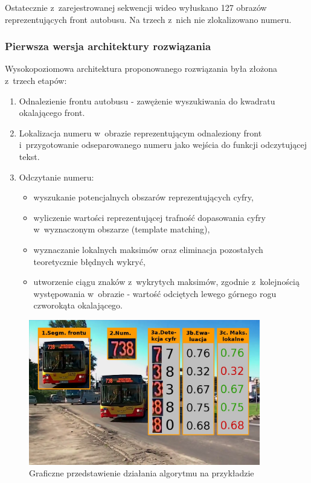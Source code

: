 Ostatecznie z~zarejestrowanej sekwencji wideo wyłuskano 127 obrazów
reprezentujących front autobusu. Na trzech z~nich nie zlokalizowano
numeru. 

\subsubsection{Pierwsza wersja architektury rozwiązania}

Wysokopoziomowa architektura proponowanego rozwiązania była złożona 
z~trzech etapów:
\begin{enumerate}
    \item Odnalezienie frontu autobusu - zawężenie wyszukiwania 
        do kwadratu okalającego front.
    \item Lokalizacja numeru w~obrazie reprezentującym odnaleziony
        front i~przygotowanie odseparowanego numeru jako wejścia
        do funkcji odczytującej tekst.
    \item Odczytanie numeru:
        \begin{itemize}
            \item wyszukanie potencjalnych obszarów reprezentujących
                cyfry,
            \item wyliczenie wartości reprezentującej trafność
                dopasowania cyfry w~wyznaczonym obszarze (template
                matching),
            \item wyznaczanie lokalnych maksimów oraz eliminacja 
                pozostałych teoretycznie błędnych wykryć,
            \item utworzenie ciągu znaków z~wykrytych maksimów,
                zgodnie z~kolejnością występowania w~obrazie -
                wartość odciętych lewego górnego rogu czworokąta
                okalającego.
        \end{itemize}
\end{enumerate}

\begin{figure}[!h]
    \centering
    \includegraphics[width=0.9\textwidth]{img/exp_alg_explanation}
    \caption{Graficzne przedstawienie działania algorytmu na przykładzie}
    \label{fig:algexp}
\end{figure}

